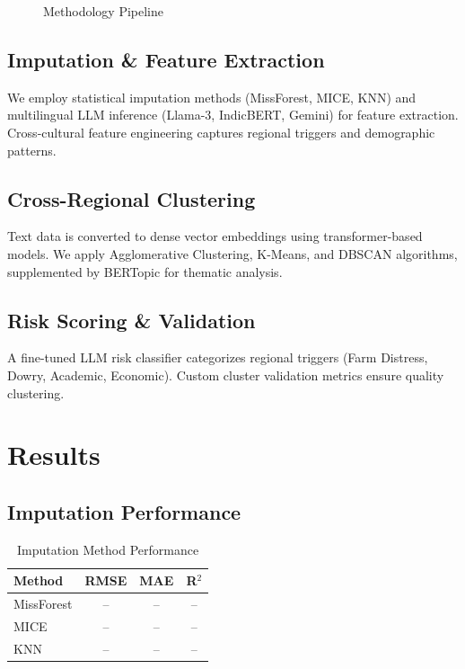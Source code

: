 \documentclass[conference]{IEEEtran}
\begin{document}
\begin{figure}[H]
\centering
{}
\caption{Methodology Pipeline}
\label{fig:pipeline}
\end{figure}

\subsection{Imputation \& Feature Extraction}
We employ statistical imputation methods (MissForest, MICE, KNN) and multilingual LLM inference (Llama-3, IndicBERT, Gemini) for feature extraction. Cross-cultural feature engineering captures regional triggers and demographic patterns.

\subsection{Cross-Regional Clustering}
Text data is converted to dense vector embeddings using transformer-based models. We apply Agglomerative Clustering, K-Means, and DBSCAN algorithms, supplemented by BERTopic for thematic analysis.

\subsection{Risk Scoring \& Validation}
A fine-tuned LLM risk classifier categorizes regional triggers (Farm Distress, Dowry, Academic, Economic). Custom cluster validation metrics ensure quality clustering.

\section{Results}

\subsection{Imputation Performance}

\begin{table}[H]
\centering
\caption{Imputation Method Performance}
\label{tab:imputation}
\begin{tabular}{@{}lccc@{}}
\toprule
\textbf{Method} & \textbf{RMSE} & \textbf{MAE} & \textbf{R$^2$} \\
\midrule
MissForest & -- & -- & -- \\
MICE & -- & -- & -- \\
KNN & -- & -- & -- \\
\bottomrule
\end{tabular}
\end{table}
\end{document}
